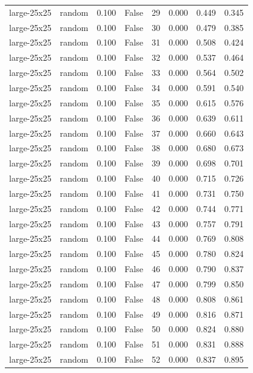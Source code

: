 \begin{tabular}{llrrrrrr}
large-25x25 & random & 0.100 & False & 29 & 0.000 & 0.449 & 0.345 \\
large-25x25 & random & 0.100 & False & 30 & 0.000 & 0.479 & 0.385 \\
large-25x25 & random & 0.100 & False & 31 & 0.000 & 0.508 & 0.424 \\
large-25x25 & random & 0.100 & False & 32 & 0.000 & 0.537 & 0.464 \\
large-25x25 & random & 0.100 & False & 33 & 0.000 & 0.564 & 0.502 \\
large-25x25 & random & 0.100 & False & 34 & 0.000 & 0.591 & 0.540 \\
large-25x25 & random & 0.100 & False & 35 & 0.000 & 0.615 & 0.576 \\
large-25x25 & random & 0.100 & False & 36 & 0.000 & 0.639 & 0.611 \\
large-25x25 & random & 0.100 & False & 37 & 0.000 & 0.660 & 0.643 \\
large-25x25 & random & 0.100 & False & 38 & 0.000 & 0.680 & 0.673 \\
large-25x25 & random & 0.100 & False & 39 & 0.000 & 0.698 & 0.701 \\
large-25x25 & random & 0.100 & False & 40 & 0.000 & 0.715 & 0.726 \\
large-25x25 & random & 0.100 & False & 41 & 0.000 & 0.731 & 0.750 \\
large-25x25 & random & 0.100 & False & 42 & 0.000 & 0.744 & 0.771 \\
large-25x25 & random & 0.100 & False & 43 & 0.000 & 0.757 & 0.791 \\
large-25x25 & random & 0.100 & False & 44 & 0.000 & 0.769 & 0.808 \\
large-25x25 & random & 0.100 & False & 45 & 0.000 & 0.780 & 0.824 \\
large-25x25 & random & 0.100 & False & 46 & 0.000 & 0.790 & 0.837 \\
large-25x25 & random & 0.100 & False & 47 & 0.000 & 0.799 & 0.850 \\
large-25x25 & random & 0.100 & False & 48 & 0.000 & 0.808 & 0.861 \\
large-25x25 & random & 0.100 & False & 49 & 0.000 & 0.816 & 0.871 \\
large-25x25 & random & 0.100 & False & 50 & 0.000 & 0.824 & 0.880 \\
large-25x25 & random & 0.100 & False & 51 & 0.000 & 0.831 & 0.888 \\
large-25x25 & random & 0.100 & False & 52 & 0.000 & 0.837 & 0.895 \\

\end{tabular}
